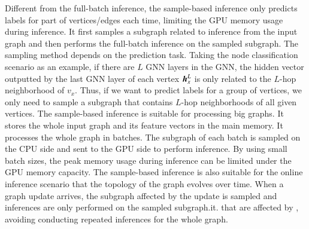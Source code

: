 Different from the full-batch inference, the sample-based inference only predicts labels for part of vertices/edges each time, limiting the GPU memory usage during inference.
%
It first samples a subgraph related to inference from the input graph and then performs the full-batch inference on the sampled subgraph.
%
The sampling method depends on the prediction task.
%
Taking the node classification scenario as an example, if there are $L$ GNN layers in the GNN, the hidden vector outputted by the last GNN layer of each vertex $\boldsymbol{h}^L_x$ is only related to the $L$-hop neighborhood of $v_x$.
%
Thus, if we want to predict labels for a group of vertices, we only need to sample a subgraph that contains $L$-hop neighborhoods of all given vertices.
%
The sample-based inference is suitable for processing big graphs.
%
It stores the whole input graph and its feature vectors in the main memory.
%
It processes the whole graph in batches.
%
The subgraph of each batch is sampled on the CPU side and sent to the GPU side to perform inference.
%
By using small batch sizes, the peak memory usage during inference can be limited under the GPU memory capacity.
%
The sample-based inference is also suitable for the online inference scenario that the topology of the graph evolves over time.
%
When a graph update arrives, the subgraph affected by the update is sampled and inferences are only performed on the sampled subgraph.it. that are affected by , avoiding conducting repeated inferences for the whole graph.

